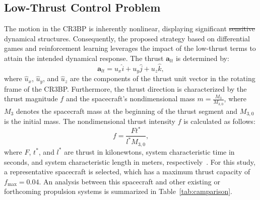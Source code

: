 \documentclass[conference]{IEEEtran}
\makeatletter
\providecommand{\DIFadd}[1]{{\protect\color{blue}\uwave{#1}}} %
\providecommand{\DIFdel}[1]{{\protect\color{red}\sout{#1}}} %
\providecommand{\DIFaddbegin}{} %
\providecommand{\DIFaddend}{} %
\providecommand{\DIFdelbegin}{} %
\providecommand{\DIFdelend}{} %
\newcommand{\DIFscaledelfig}{0.5}
\newlength{\DIFdelgraphicswidth} %
\newlength{\DIFdelgraphicsheight} %
\newcommand{\DIFaddincludegraphics}[2][]{{\color{blue}\fbox{\DIFOincludegraphics[#1]{#2}}}} %
\newcommand{\DIFdelincludegraphics}[2][]{%
\sbox{\DIFdelgraphicsbox}{\DIFOincludegraphics[#1]{#2}}%
\settoboxwidth{\DIFdelgraphicswidth}{\DIFdelgraphicsbox} %
\settoboxtotalheight{\DIFdelgraphicsheight}{\DIFdelgraphicsbox} %
\scalebox{\DIFscaledelfig}{%
\parbox[b]{\DIFdelgraphicswidth}{\usebox{\DIFdelgraphicsbox}\\[-\baselineskip] \rule{\DIFdelgraphicswidth}{0em}}\llap{\resizebox{\DIFdelgraphicswidth}{\DIFdelgraphicsheight}{%
\setlength{\unitlength}{\DIFdelgraphicswidth}%
\begin{picture}(1,1)%
\thicklines\linethickness{2pt} %
{\color[rgb]{1,0,0}\put(0,0){\framebox(1,1){}}}%
{\color[rgb]{1,0,0}\put(0,0){\line( 1,1){1}}}%
{\color[rgb]{1,0,0}\put(0,1){\line(1,-1){1}}}%
\end{picture}%
}\hspace*{3pt}}} %
} %
\DeclareRobustCommand{\DIFaddbegin}{\DIFOaddbegin \let\includegraphics\DIFaddincludegraphics} %
\DeclareRobustCommand{\DIFaddend}{\DIFOaddend \let\includegraphics\DIFOincludegraphics} %
\DeclareRobustCommand{\DIFdelbegin}{\DIFOdelbegin \let\includegraphics\DIFdelincludegraphics} %
\DeclareRobustCommand{\DIFdelend}{\DIFOaddend \let\includegraphics\DIFOincludegraphics} %
\let\sout@orig\sout %
\renewcommand{\sout}[1]{\ifmmode\text{\sout@orig{\ensuremath{#1}}}\else\sout@orig{#1}\fi} %
\makeatother
\begin{document}
\subsection{Low-Thrust Control Problem}
The motion in the CR3BP is inherently nonlinear, displaying significant \DIFdelbegin \DIFdel{sensitive }\DIFdelend \DIFaddbegin \DIFadd{sensitivity in }\DIFaddend dynamical structures. Consequently, the proposed strategy based on differential games and reinforcement learning leverages the impact of the low-thrust terms to attain the intended dynamical response. The thrust \(\mathbf{a}_{lt}\) is determined by:
\begin{equation}
\mathbf{a}_{lt} =  {u}_x \hat{i} + {u}_y \hat{j} + {u}_z \hat{k},
\end{equation}
where \( \hat{u}_x \), \( \hat{u}_y \), and \( \hat{u}_z \) are the components of the thrust unit vector in the rotating frame of the CR3BP. Furthermore, the thrust direction is characterized by the thrust magnitude \( f \) and the spacecraft's nondimensional mass \( m = \frac{M_3}{M_{3,0}} \), where \( M_3 \) denotes the spacecraft mass at the beginning of the thrust segment and \( M_{3,0} \) is the initial mass.
The nondimensional thrust intensity \( f \) is calculated as follows:
\begin{equation}
f = \dfrac{Ft^*}{l^* M_{3,0}},
\end{equation}
where \( F \), \(t^*\), and \(l^*\) are thrust in kilonewtons, system characteristic time in seconds, and system characteristic length in meters, respectively~\cite{lafarge}.
For this study, a representative spacecraft is selected, which has a maximum thrust capacity of \( f_{\text{max}} = 0.04 \). An analysis between this spacecraft and other existing or forthcoming propulsion systems is summarized in Table~\ref{tab:camparison}.
\end{document}
